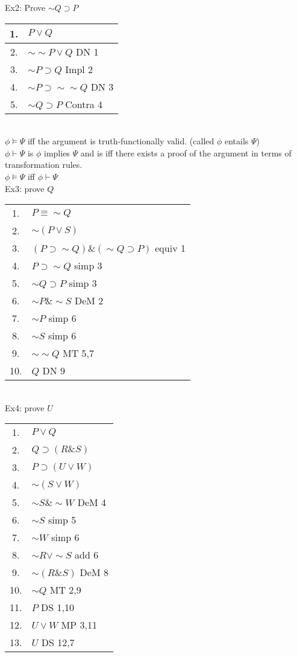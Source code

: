 Ex2: Prove $\sim Q\supset P$\\
\begin{tabular}{cl}
    1. & $P\vee Q$\\
    \hline
    2. & $\sim\sim P\vee Q$ DN 1\\
    3. & $\sim P\supset Q$ Impl 2\\
    4. & $\sim P\supset \sim\sim Q$ DN 3\\
    5. & $\sim Q\supset P$ Contra 4
\end{tabular}\\
$\phi \vDash\Psi$ iff the argument  is truth-functionally valid. (called $\phi$ entails $\Psi$)\\
$\phi\vdash\Psi$ is $\phi$ implies $\Psi$ and is iff there exists a proof of the argument in terms of transformation rules.\\
$\phi\vDash\Psi$ iff $\phi\vdash\Psi$\\
Ex3: prove $Q$\\
\begin{tabular}{cl}
    1. & $P\equiv \sim Q$\\
    2. & $\sim(P\vee S)$\\
    \hline
    3. & $(P\supset\sim Q)\&(\sim Q\supset P)$ equiv 1\\
    4. & $P\supset \sim Q$ simp 3\\
    5. & $\sim Q\supset P$ simp 3\\
    6. & $\sim P\&\sim S$ DeM 2\\
    7. & $\sim P$ simp 6\\
    8. & $\sim S$ simp 6\\
    9. & $\sim \sim Q$ MT 5,7\\
    10. & $Q$ DN 9
\end{tabular}\\
Ex4: prove $U$\\
\begin{tabular}{cl}
    1. & $P\vee Q$\\
    2. & $Q\supset(R\& S)$\\
    3. & $P\supset(U\vee W)$\\
    4. & $\sim(S\vee W)$\\
    \hline
    5. & $\sim S\&\sim W$ DeM 4\\
    6. & $\sim S$ simp 5\\
    7. & $\sim W$ simp 6\\
    8. & $\sim R\vee \sim S$ add 6\\
    9. & $\sim(R\& S)$ DeM 8\\
    10. & $\sim Q$ MT 2,9\\
    11. & $P$ DS 1,10\\
    12. & $U\vee W$ MP 3,11\\
    13. & $U$ DS 12,7
\end{tabular}
